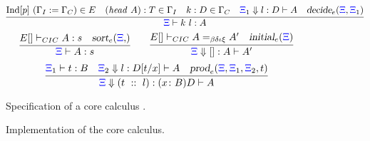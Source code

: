 \begin{figure}[t]
\centering
  \[
\infer{\XXi\vdash k\ l : A}
      { \mathrm{Ind}[p] \ (\Gamma_I := \Gamma_C) \in E\quad 
       (\mathit{head} \ A) : T \in \Gamma_I\quad  
       k : D \in \Gamma_C\quad 
       \bc{\XXi_1}{} l D A \quad\unfoldExpert{\XXi}{\XXi_1}} 
\]
\vskip -18pt
\[
  \infer{\XXi\vdash  A : s}{E[] \vdash_{CIC} A : s\quad \sortExpert{\XXi}}%
  \qquad
  \infer{\bc{\XXi}{}{[]} A A'}{E[]\vdash_{CIC} A =_{\beta\delta\iota\xi}A'\quad\initLExpert{\XXi}}
\]
  \vskip -18pt
\[
  \infer{\bc{\XXi}{}{(t\ ::\ l)}{\depprod{x}{B}{D}}{A}}
        {\XXi_1\vdash t : B\quad
         \bc{\XXi_2}{}l {D[t/x]} A\quad
         \prodE{\XXi}{\XXi_1}{\XXi_2}{t}}
\]
\caption{Specification of a core calculus%
  .}
\label{fig:augmented}
\end{figure}

\begin{figure}


\caption{Implementation of the core calculus.}
\label{fig:kernel}
\end{figure}

